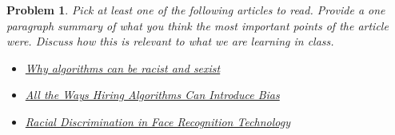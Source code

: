 \documentclass{article}
\newtheorem{problem}{Problem}
\begin{document}
\begin{problem}
    Pick at least one of the following articles to read. 
    Provide a one paragraph summary of what you think the most important points of the article were.
    Discuss how this is relevant to what we are learning in class.

    \begin{itemize}[nolistsep]
        \item \href{https://www.vox.com/recode/2020/2/18/21121286/algorithms-bias-discrimination-facial-recognition-transparency}{Why algorithms can be racist and sexist}
        \item \href{https://hbr.org/2019/05/all-the-ways-hiring-algorithms-can-introduce-bias}{All the Ways Hiring Algorithms Can Introduce Bias}
        \item \href{https://sitn.hms.harvard.edu/flash/2020/racial-discrimination-in-face-recognition-technology/}{Racial Discrimination in Face Recognition Technology}
    \end{itemize}
\end{problem}
\end{document}
